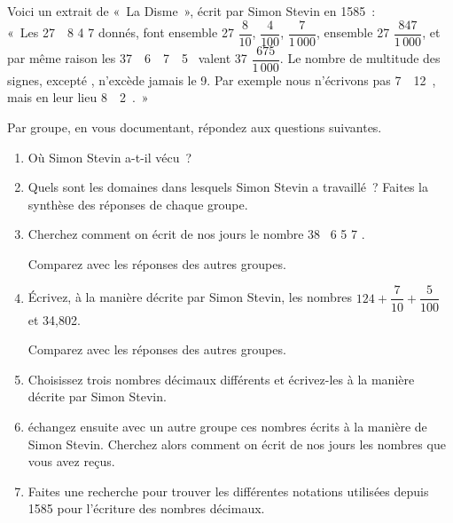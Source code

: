 
\begin{TP}[]
Voici un extrait de « La Disme », écrit par Simon Stevin en 1585 : \\[0.5em]

« Les 27  8  4  7  donnés, font ensemble 27 $\dfrac{8}{10}$, $\dfrac{4}{100}$, $\dfrac{7}{1\,000}$, ensemble 27 $\dfrac{847}{1\,000}$, et par même raison les 37  6  7  5  valent 37 $\dfrac{675}{1\,000}$. Le nombre de multitude des signes, excepté , n'excède jamais le 9. Par exemple nous n'écrivons pas 7  12 , mais en leur lieu 8  2 . »


Par groupe, en vous documentant, répondez aux questions suivantes.
\begin{enumerate}
 \item Où Simon Stevin a-t-il vécu ?
 \item Quels sont les domaines dans lesquels Simon Stevin a travaillé ? Faites la synthèse des réponses de chaque groupe.


\item Cherchez comment on écrit de nos jours le nombre 38  6  5  7 ­.

Comparez avec les réponses des autres groupes.

\item Écrivez, à la manière décrite par Simon Stevin, les nombres $124 + \dfrac{7}{10} + \dfrac{5}{100}$ et 34,802.

Comparez avec les réponses des autres groupes.

 \item Choisissez trois nombres décimaux différents et écrivez-les à la manière décrite par Simon Stevin.
 \item échangez ensuite avec un autre groupe ces nombres écrits à la manière de Simon Stevin. Cherchez alors comment on écrit de nos jours les nombres que vous avez reçus.
 \item Faites une recherche pour trouver les différentes notations utilisées depuis 1585 pour l'écriture des nombres décimaux.
 \end{enumerate}
\end{TP}



